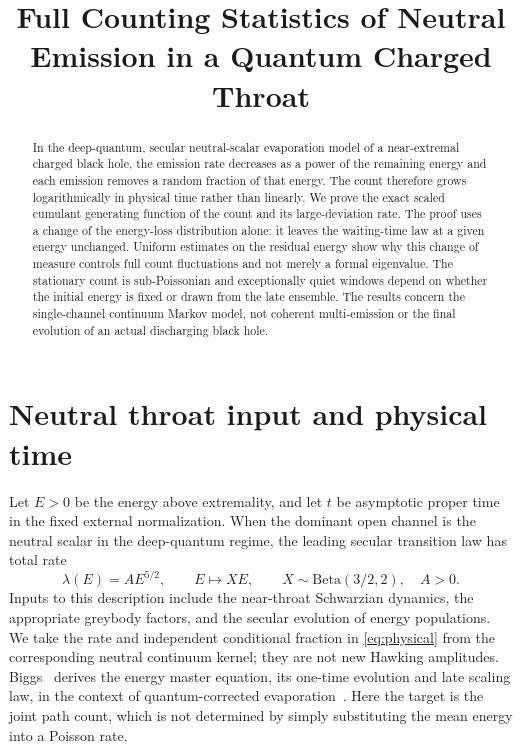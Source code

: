 \documentclass[10pt]{article}
\title{Full Counting Statistics of Neutral Emission in a Quantum Charged Throat}
\author{}
\date{}
\begin{document}
\maketitle
\begin{abstract}
In the deep-quantum, secular neutral-scalar evaporation model of a near-extremal charged black hole, the emission rate decreases as a power of the remaining energy and each emission removes a random fraction of that energy. The count therefore grows logarithmically in physical time rather than linearly. We prove the exact scaled cumulant generating function of the count and its large-deviation rate. The proof uses a change of the energy-loss distribution alone: it leaves the waiting-time law at a given energy unchanged. Uniform estimates on the residual energy show why this change of measure controls full count fluctuations and not merely a formal eigenvalue. The stationary count is sub-Poissonian and exceptionally quiet windows depend on whether the initial energy is fixed or drawn from the late ensemble. The results concern the single-channel continuum Markov model, not coherent multi-emission or the final evolution of an actual discharging black hole.
\end{abstract}

\section{Neutral throat input and physical time}
Let $E>0$ be the energy above extremality, and let $t$ be asymptotic proper time in the fixed external normalization. When the dominant open channel is the neutral scalar in the deep-quantum regime, the leading secular transition law has total rate
\begin{equation}
\lambda(E)=A E^{5/2},\qquad E\mapsto XE,\qquad
X\sim\mathrm{Beta}(3/2,2),\quad A>0.
\label{eq:physical}
\end{equation}
Inputs to this description include the near-throat Schwarzian dynamics, the appropriate greybody factors, and the secular evolution of energy populations. We take the rate and independent conditional fraction in \eqref{eq:physical} from the corresponding neutral continuum kernel; they are not new Hawking amplitudes. Biggs~\cite{Biggs} derives the energy master equation, its one-time evolution and late scaling law, in the context of quantum-corrected evaporation~\cite{IPU,BK}. Here the target is the joint path count, which is not determined by simply substituting the mean energy into a Poisson rate.
\end{document}
